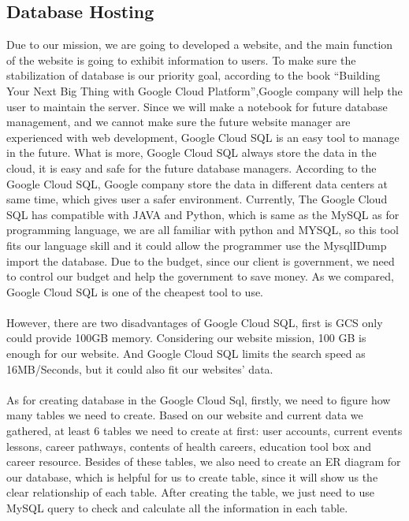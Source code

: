 \documentclass[letterpaper,10pt, draftclsnofoot,onecolumn]{IEEEtran}
\begin{document}
{{\subsection[Database Hosting]{\noindent\color{black}
Database Hosting}
\noindent Due to our mission, we are going to developed a website, and the main function of the website is going to exhibit information to users. To make sure the stabilization of database is our priority goal, according to the book “Building Your Next Big Thing with Google Cloud Platform”\cite{book7},Google company will help the user to maintain the server. Since we will make a notebook for future database management, and we cannot make sure the future website manager are experienced with web development,  Google Cloud SQL is an easy tool to manage in the future. What is more, Google Cloud SQL always store the data in the cloud, it is easy and safe for the future database managers. According to the Google Cloud SQL, Google company store the data in different data centers at same time, which gives user a safer environment. Currently, The Google Cloud SQL has compatible with JAVA and Python, which is same as the MySQL as for programming language, we are all familiar with python and MYSQL, so this tool fits our language skill and it could allow the programmer use the MysqlIDump import the database. Due to the budget, since our client is government, we need to control our budget and help the government to save money. As we compared, Google Cloud SQL is one of the cheapest tool to use. 
\\ \\
\noindent However, there are two disadvantages of Google Cloud SQL, first is GCS only could provide 100GB memory. Considering our website mission, 100 GB is enough for our website. And  Google Cloud SQL limits the search speed as 16MB/Seconds, but it could also fit our websites’ data.
\\ \\
\noindent As for creating database in the Google Cloud Sql, firstly, we need to figure how many tables we need to create. Based on our website and current data we gathered, at least 6 tables we need to create at first: user accounts, current events lessons, career pathways, contents of health careers, education tool box and career resource. Besides of these tables, we also need to create an ER diagram for our database, which is helpful for us to create table, since it will show us the clear relationship of each table. After creating the table, we just need to use MySQL query to check and calculate all the information in each table.
}}
\end{document}
